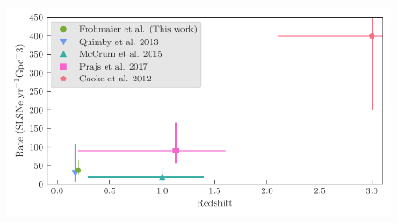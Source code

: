 \documentclass[a4paper,fleqn,usenatbib]{mnras}
\begin{document}
\begin{figure}
	\includegraphics[width=\linewidth]{./SLSN_Compare_Literature.pdf}
    \caption{}
    \label{fig:rates_SLSN_Lit}
\end{figure}




\end{document}
